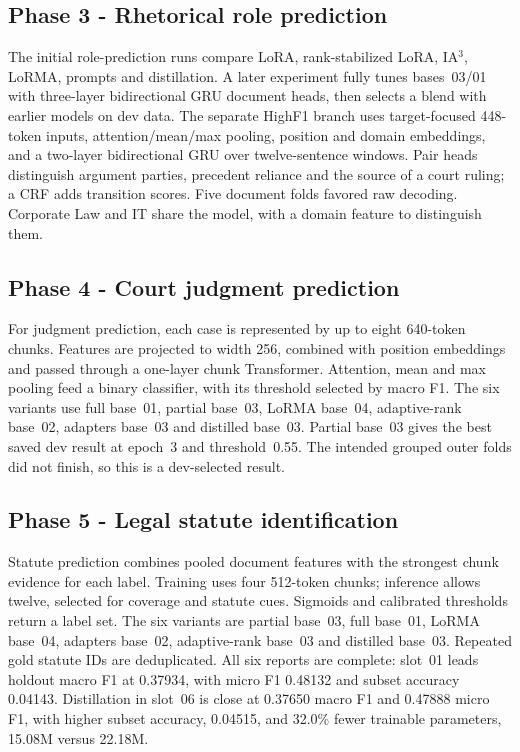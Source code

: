 \subsection{Phase 3 - Rhetorical role prediction}
The initial role-prediction runs compare LoRA, rank-stabilized LoRA, IA$^3$, LoRMA, prompts and distillation. A later experiment fully tunes bases~03/01 with three-layer bidirectional GRU document heads, then selects a blend with earlier models on dev data. The separate HighF1 branch uses target-focused 448-token inputs, attention/mean/max pooling, position and domain embeddings, and a two-layer bidirectional GRU over twelve-sentence windows. Pair heads distinguish argument parties, precedent reliance and the source of a court ruling; a CRF adds transition scores. Five document folds favored raw decoding. Corporate Law and IT share the model, with a domain feature to distinguish them.

\subsection{Phase 4 - Court judgment prediction}
For judgment prediction, each case is represented by up to eight 640-token chunks. Features are projected to width 256, combined with position embeddings and passed through a one-layer chunk Transformer. Attention, mean and max pooling feed a binary classifier, with its threshold selected by macro F1. The six variants use full base~01, partial base~03, LoRMA base~04, adaptive-rank base~02, adapters base~03 and distilled base~03. Partial base~03 gives the best saved dev result at epoch~3 and threshold~0.55. The intended grouped outer folds did not finish, so this is a dev-selected result.

\subsection{Phase 5 - Legal statute identification}
Statute prediction combines pooled document features with the strongest chunk evidence for each label. Training uses four 512-token chunks; inference allows twelve, selected for coverage and statute cues. Sigmoids and calibrated thresholds return a label set. The six variants are partial base~03, full base~01, LoRMA base~04, adapters base~02, adaptive-rank base~03 and distilled base~03. Repeated gold statute IDs are deduplicated. All six reports are complete: slot~01 leads holdout macro F1 at 0.37934, with micro F1 0.48132 and subset accuracy 0.04143. Distillation in slot~06 is close at 0.37650 macro F1 and 0.47888 micro F1, with higher subset accuracy, 0.04515, and 32.0\% fewer trainable parameters, 15.08M versus 22.18M.

